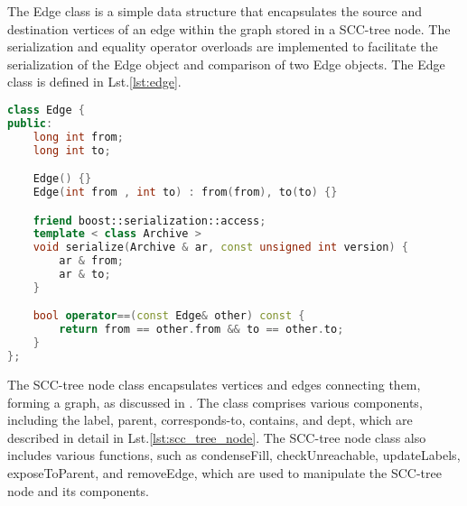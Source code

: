 The Edge class is a simple data structure that encapsulates the source and destination vertices of an edge within the graph stored in a SCC-tree node.
The serialization and equality operator overloads are implemented to facilitate the serialization of the Edge object and comparison of two Edge objects.
The Edge class is defined in Lst.\ref{lst:edge}.

\begin{lstlisting}[language=C++, caption={Edge}, label={lst:edge}]
class Edge {
public:
    long int from;
    long int to;

    Edge() {}
    Edge(int from , int to) : from(from), to(to) {}

    friend boost::serialization::access;
    template < class Archive >
    void serialize(Archive & ar, const unsigned int version) {
        ar & from;
        ar & to;
    }

    bool operator==(const Edge& other) const {
        return from == other.from && to == other.to;
    }
};
\end{lstlisting}

The SCC-tree node class encapsulates vertices and edges connecting them, forming a graph, as discussed in \secref{\ref{Subsubsec: SCC Tree}}.
The class comprises various components, including the label, parent, corresponds-to, contains, and dept, which are described in detail in Lst.\ref{lst:scc_tree_node}.
The SCC-tree node class also includes various functions, such as condenseFill, checkUnreachable, updateLabels, exposeToParent, and removeEdge, which are used to manipulate the SCC-tree node and its components.

